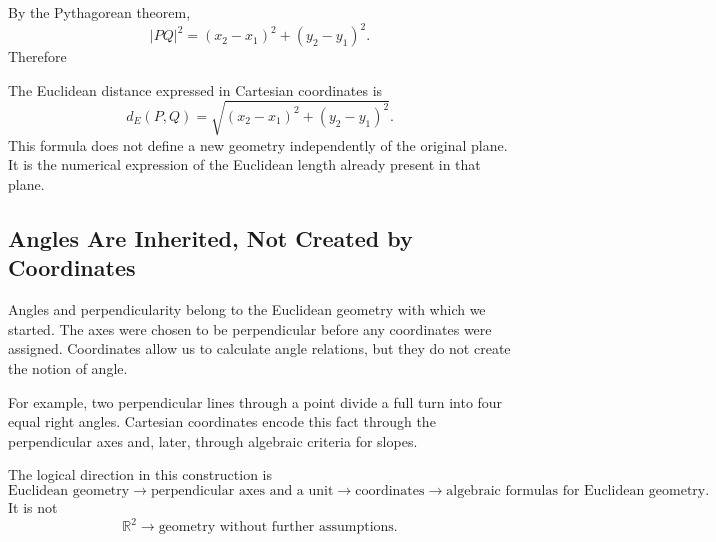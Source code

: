 \begin{center}
\end{center}

By the Pythagorean theorem,
\[
|PQ|^2
=
(x_2-x_1)^2+(y_2-y_1)^2.
\]
Therefore
\begin{theorembox}
The Euclidean distance expressed in Cartesian coordinates is
\[
\boxed{
d_E(P,Q)
=
\sqrt{(x_2-x_1)^2+(y_2-y_1)^2}
}.
\]
This formula does not define a new geometry independently of the original
plane.  It is the numerical expression of the Euclidean length already present
in that plane.
\end{theorembox}

\subsection{Angles Are Inherited, Not Created by Coordinates}

Angles and perpendicularity belong to the Euclidean geometry with which we
started.  The axes were chosen to be perpendicular before any coordinates were
assigned.  Coordinates allow us to calculate angle relations, but they do not
create the notion of angle.

For example, two perpendicular lines through a point divide a full turn into
four equal right angles.  Cartesian coordinates encode this fact through the
perpendicular axes and, later, through algebraic criteria for slopes.

\begin{remarkbox}
The logical direction in this construction is
\[
\text{Euclidean geometry}
\longrightarrow
\text{perpendicular axes and a unit}
\longrightarrow
\text{coordinates}
\longrightarrow
\text{algebraic formulas for Euclidean geometry}.
\]
It is not
\[
\mathbb R^2
\longrightarrow
\text{geometry without further assumptions}.
\]
\end{remarkbox}

